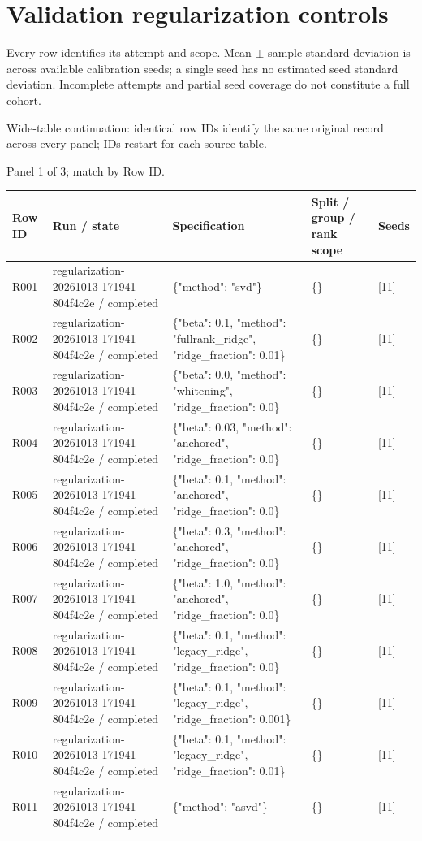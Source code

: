 \documentclass[10pt]{article}
\begin{document}
\section{Validation regularization controls}

Every row identifies its attempt and scope. Mean \(\pm\) sample standard deviation is across available calibration seeds; a single seed has no estimated seed standard deviation. Incomplete attempts and partial seed coverage do not constitute a full cohort.

Wide-table continuation: identical row IDs identify the same original record across every panel; IDs restart for each source table.
\par\noindent Panel 1 of 3; match by Row ID.
{\scriptsize\setlength{\tabcolsep}{2pt}
\begin{longtable}{p{}p{}p{}p{}p{}}
Row ID & Run / state & Specification & Split / group / rank scope & Seeds \\
\hline\endhead
R001 & regularization-20261013-171941-804f4c2e / completed & \{"method": "svd"\} & \{\} & [11] \\
R002 & regularization-20261013-171941-804f4c2e / completed & \{"beta": 0.1, "method": "fullrank\_ridge", "ridge\_fraction": 0.01\} & \{\} & [11] \\
R003 & regularization-20261013-171941-804f4c2e / completed & \{"beta": 0.0, "method": "whitening", "ridge\_fraction": 0.0\} & \{\} & [11] \\
R004 & regularization-20261013-171941-804f4c2e / completed & \{"beta": 0.03, "method": "anchored", "ridge\_fraction": 0.0\} & \{\} & [11] \\
R005 & regularization-20261013-171941-804f4c2e / completed & \{"beta": 0.1, "method": "anchored", "ridge\_fraction": 0.0\} & \{\} & [11] \\
R006 & regularization-20261013-171941-804f4c2e / completed & \{"beta": 0.3, "method": "anchored", "ridge\_fraction": 0.0\} & \{\} & [11] \\
R007 & regularization-20261013-171941-804f4c2e / completed & \{"beta": 1.0, "method": "anchored", "ridge\_fraction": 0.0\} & \{\} & [11] \\
R008 & regularization-20261013-171941-804f4c2e / completed & \{"beta": 0.1, "method": "legacy\_ridge", "ridge\_fraction": 0.0\} & \{\} & [11] \\
R009 & regularization-20261013-171941-804f4c2e / completed & \{"beta": 0.1, "method": "legacy\_ridge", "ridge\_fraction": 0.001\} & \{\} & [11] \\
R010 & regularization-20261013-171941-804f4c2e / completed & \{"beta": 0.1, "method": "legacy\_ridge", "ridge\_fraction": 0.01\} & \{\} & [11] \\
R011 & regularization-20261013-171941-804f4c2e / completed & \{"method": "asvd"\} & \{\} & [11] \\
\end{longtable}}
\end{document}
